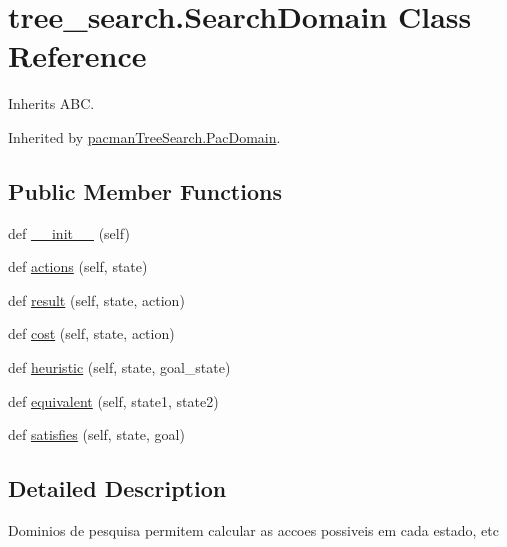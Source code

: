 \hypertarget{classtree__search_1_1_search_domain}{}\section{tree\+\_\+search.\+Search\+Domain Class Reference}
\label{classtree__search_1_1_search_domain}


Inherits A\+BC.



Inherited by \hyperlink{classpacman_tree_search_1_1_pac_domain}{pacman\+Tree\+Search.\+Pac\+Domain}.

\subsection*{Public Member Functions}
\begin{DoxyCompactItemize}
\item 
def \hyperlink{classtree__search_1_1_search_domain_a999e1019349c560c6be69c2b0132071a}{\+\_\+\+\_\+init\+\_\+\+\_\+} (self)
\item 
def \hyperlink{classtree__search_1_1_search_domain_a282e6d3cafb862fbd45abc77d6014994}{actions} (self, state)
\item 
def \hyperlink{classtree__search_1_1_search_domain_ad648ea701b43371cf3e5a417696b548a}{result} (self, state, action)
\item 
def \hyperlink{classtree__search_1_1_search_domain_a9144f065c8ea3e69f7b121e059a3314e}{cost} (self, state, action)
\item 
def \hyperlink{classtree__search_1_1_search_domain_a16377c0c9f043989856be86c1900b065}{heuristic} (self, state, goal\+\_\+state)
\item 
def \hyperlink{classtree__search_1_1_search_domain_a5ccccbd28a0a914082558dead4690842}{equivalent} (self, state1, state2)
\item 
def \hyperlink{classtree__search_1_1_search_domain_a84bde7249dd756455329b0bfb6977b61}{satisfies} (self, state, goal)
\end{DoxyCompactItemize}


\subsection{Detailed Description}
\begin{DoxyVerb}Dominios de pesquisa permitem calcular as accoes possiveis em cada estado, etc\end{DoxyVerb}
 

